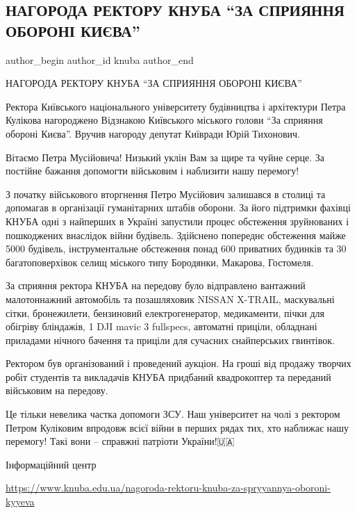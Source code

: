  
 
 
 
 

\subsection{НАГОРОДА РЕКТОРУ КНУБА \enquote{ЗА СПРИЯННЯ ОБОРОНІ КИЄВА}}
\label{sec:04_07_2023.fb.knuba.1.nagoroda_rektoru_knuba_za_spryjannja_oboroni_kyeva}

\ifcmt
 author_begin
   author_id knuba
 author_end
\fi

НАГОРОДА РЕКТОРУ КНУБА \enquote{ЗА СПРИЯННЯ ОБОРОНІ КИЄВА}

Ректора Київського національного університету будівництва і архітектури Петра
Кулікова нагороджено Відзнакою Київського міського голови \enquote{За сприяння обороні
Києва}. Вручив нагороду депутат Київради Юрій Тихонович.

Вітаємо Петра Мусійовича!  Низький уклін Вам  за щире та чуйне серце. За
постійне бажання допомогти військовим і наблизити нашу перемогу!

З початку військового вторгнення Петро Мусійович залишався в столиці та
допомагав в організації гуманітарних штабів оборони. За його підтримки фахівці
КНУБА одні з найперших в Україні запустили  процес обстеження зруйнованих і
пошкоджених внаслідок війни будівель. Здійснено попереднє обстеження майже 5000
будівель, інструментальне обстеження понад 600 приватних будинків та 30
багатоповерхівок селищ міського типу Бородянки, Макарова, Гостомеля.

За сприяння ректора КНУБА на передову було відправлено вантажний малотоннажний
автомобіль та позашляховик  NISSAN X-TRAІL,  маскувальні сітки, бронежилети,
бензиновий  електрогенератор, медикаменти, пічки для обігріву бліндажів, 1 DJI
mavic 3 fullspecs, автоматні приціли, обладнані приладами нічного бачення та
приціли для сучасних снайперських гвинтівок. 

Ректором був організований і проведений аукціон. На гроші від продажу творчих
робіт студентів та викладачів КНУБА придбаний квадрокоптер та переданий
військовим на передову.

Це тільки невелика частка допомоги ЗСУ. Наш університет на чолі з ректором
Петром Куліковим  впродовж всієї війни в перших рядах тих, хто наближає нашу
перемогу! Такі вони – справжні патріоти України!🇺🇦

Інформаційний центр

\url{https://www.knuba.edu.ua/nagoroda-rektoru-knuba-za-spryyannya-oboroni-kyyeva}
